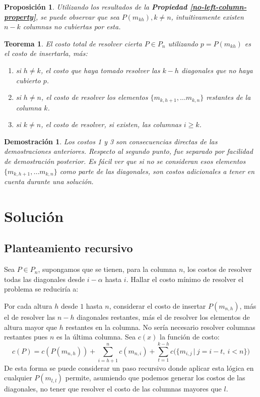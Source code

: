 \documentclass{article}
\theoremstyle{default}
\newtheorem{theorem}{Teorema}
\newtheorem*{proposition}{Proposición}
\newtheorem*{demonstration}{Demostración}
\begin{document}
	\begin{proposition}
		Utilizando los resultados de la \textbf{Propiedad \ref{no-left-column-property}}, se puede observar que sea $P(m_{kh}), k \neq n$, intuitivamente existen $n - k$ columnas no cubiertas por esta.
	\end{proposition}
	\begin{theorem}
		El costo total de resolver cierta $P \in P_n$ utilizando $p = P(m_{kh})$ es el costo de insertarla, más:
		\begin{enumerate}
			\item si $h \neq k$, el costo que haya tomado resolver las $k - h$ diagonales que no haya cubierto $p$.
			\item si $h \neq n$, el costo de resolver los elementos $\{m_{k,h+1}, \dots m_{k,n}\}$ restantes de la columna $k$.
			\item si $k \neq n$, el costo de resolver, si existen, las columnas $i \geq k$.
		\end{enumerate}
	\end{theorem}
	\begin{demonstration}
		Los costos 1 y 3 son consecuencias directas de las demostraciones anteriores. Respecto al segundo punto, fue separado por facilidad de demostración posterior. Es fácil ver que si no se consideran esos elementos $\{m_{k,h+1}, \dots m_{k,n}\}$ como parte de las diagonales, son costos adicionales a tener en cuenta durante una solución.
	\end{demonstration}	
%
\section{Solución}
	\subsection{Planteamiento recursivo}
		Sea $P \in P_n$, supongamos que se tienen, para la columna $n$, los costos de resolver todas las diagonales desde $i-\alpha$ hasta $i$. Hallar el costo mínimo de resolver el problema se reduciría a:

		Por cada altura $h$ desde $1$ hasta $n$, considerar el costo de insertar $P(m_{n,h})$, más el de resolver las $n-h$ diagonales restantes, más el de resolver los elementos de altura mayor que $h$ restantes en la columna. No sería necesario resolver columnas restantes pues $n$ es la última columna. Sea $c(x)$ la función de costo:
		\begin{equation}
			\label{subpyramid_costs}
			c(P) = c(P(m_{n,h})) + \sum\limits_{i=h+1}^{n}{c(m_{n,i})}
								 + \sum\limits_{t=1}^{k-h}{c\Big(
										\Big\{m_{i,j} \, | \ j=i-t,\ i < n \Big\}\Big)}
		\end{equation}
		De esta forma se puede considerar un paso recursivo donde aplicar esta lógica en cualquier $P(m_{l,l})$ permite, asumiendo que podemos generar los costos de las diagonales, no tener que resolver el costo de las columnas mayores que $l$.
\end{document}
